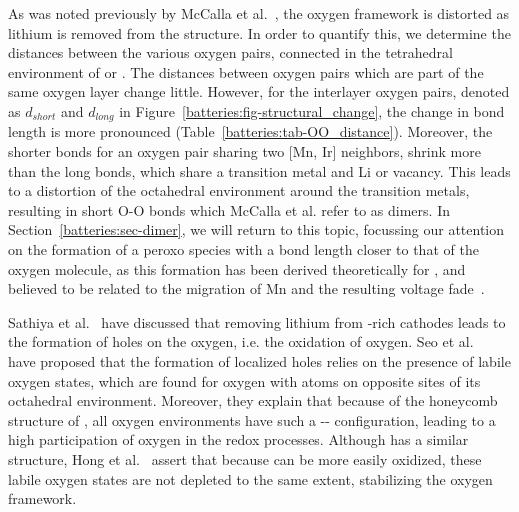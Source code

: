 \begin{refsection}
As was noted previously by McCalla et al.~\cite{McCalla2015}, the oxygen 
framework is distorted as lithium is removed from the structure. In order to 
quantify this, we determine the distances between the various oxygen pairs, 
connected in the tetrahedral environment of  or . The distances 
between oxygen pairs which are part of the same oxygen layer change little. 
However, for the interlayer oxygen pairs, denoted as $d_{short}$ and 
$d_{long}$ in Figure~\ref{batteries:fig-structural_change}, the change in bond 
length is more pronounced (Table~\ref{batteries:tab-OO_distance}). Moreover, 
the shorter bonds for an oxygen pair sharing two [Mn, Ir] neighbors, shrink 
more than the long bonds, which share a transition metal and Li or vacancy. 
This leads to a distortion of the octahedral environment around the transition 
metals, resulting in short O-O bonds which McCalla et al. refer to as dimers. 
In Section~\ref{batteries:sec-dimer}, we will return to this topic, focussing 
our attention on the formation of a peroxo species with a bond length closer 
to that of the oxygen molecule, as this formation has been derived 
theoretically for , and believed to be related to the migration of Mn 
and the resulting voltage fade~\cite{Chen2016}. 
 
 
 
Sathiya et al.~\cite{Sathiya2013} have discussed that removing lithium from 
-rich cathodes leads to the formation of holes on the oxygen, i.e. the 
oxidation of oxygen. Seo et al.~\cite{Seo2016} have proposed that the 
formation of localized holes relies on the presence of labile oxygen states, 
which are found for oxygen with  atoms on opposite sites of its 
octahedral environment. Moreover, they explain that because of the honeycomb 
structure of , all oxygen environments have such a 
-- configuration, leading to a high participation of 
oxygen in the redox processes. Although  has a similar structure, 
Hong et al.~\cite{Hong2019} assert that because  can be more 
easily oxidized, these labile oxygen states are not depleted to the same 
extent, stabilizing the oxygen framework. 
 

\end{refsection}
